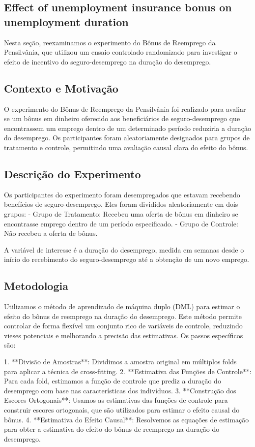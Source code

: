 \documentclass[a4paper,12pt]{article}[abntex2]
\begin{document}
\subsection{Effect of unemployment insurance bonus on unemployment duration}

Nesta seção, reexaminamos o experimento do Bônus de Reemprego da Pensilvânia, que utilizou um ensaio controlado randomizado para investigar o efeito de incentivo do seguro-desemprego na duração do desemprego.

\subsection*{Contexto e Motivação}

O experimento do Bônus de Reemprego da Pensilvânia foi realizado para avaliar se um bônus em dinheiro oferecido aos beneficiários de seguro-desemprego que encontrassem um emprego dentro de um determinado período reduziria a duração do desemprego. Os participantes foram aleatoriamente designados para grupos de tratamento e controle, permitindo uma avaliação causal clara do efeito do bônus.

\subsection*{Descrição do Experimento}

Os participantes do experimento foram desempregados que estavam recebendo benefícios de seguro-desemprego. Eles foram divididos aleatoriamente em dois grupos:
- Grupo de Tratamento: Recebeu uma oferta de bônus em dinheiro se encontrasse emprego dentro de um período especificado.
- Grupo de Controle: Não recebeu a oferta de bônus.

A variável de interesse é a duração do desemprego, medida em semanas desde o início do recebimento do seguro-desemprego até a obtenção de um novo emprego.

\subsection*{Metodologia}

Utilizamos o método de aprendizado de máquina duplo (DML) para estimar o efeito do bônus de reemprego na duração do desemprego. Este método permite controlar de forma flexível um conjunto rico de variáveis de controle, reduzindo vieses potenciais e melhorando a precisão das estimativas. Os passos específicos são:

1. **Divisão de Amostras**: Dividimos a amostra original em múltiplos folds para aplicar a técnica de cross-fitting.
2. **Estimativa das Funções de Controle**: Para cada fold, estimamos a função de controle que prediz a duração do desemprego com base nas características dos indivíduos.
3. **Construção dos Escores Ortogonais**: Usamos as estimativas das funções de controle para construir escores ortogonais, que são utilizados para estimar o efeito causal do bônus.
4. **Estimativa do Efeito Causal**: Resolvemos as equações de estimação para obter a estimativa do efeito do bônus de reemprego na duração do desemprego.
\end{document}
